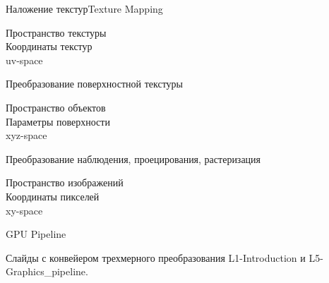 \documentclass{beamer}
\begin{document}
	\begin{frame}{Наложение текстур}{Texture Mapping}

		Пространство текстуры \\
		Координаты текстур \\
		uv-space

		{\hfill
			Преобразование поверхностной текстуры
		}

		Пространство объектов \\
		Параметры поверхности \\
		xyz-space
		
		{\hfill
			Преобразование наблюдения, проецирования, растеризация
		}
		
		Пространство изображений \\
		Координаты пикселей \\
		xy-space
		

	\end{frame}

	\begin{frame}{GPU Pipeline}

		Слайды с конвейером трехмерного преобразования
		L1-Introduction и L5-Graphics\_pipeline.

	\end{frame}
\end{document}
